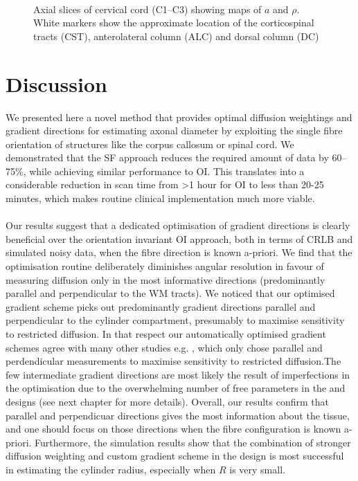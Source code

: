 \begin{figure}[ht]
	\centering
	\\	
	\caption{Axial slices of cervical cord (C1--C3) showing maps of $a$ and $\rho$. White markers show the approximate location of the corticospinal tracts (CST), anterolateral column (ALC) and dorsal column (DC)}
	\label{fig:chapter7 exp1 monkey data}
\end{figure}

\section{Discussion}
We presented here a novel method that provides optimal diffusion weightings and gradient directions for estimating axonal diameter by exploiting the single fibre orientation of structures like the corpus callosum or spinal cord. We demonstrated that the {\gls{SF}} approach reduces the required amount of data by 60--75\%, while achieving similar performance to {\gls{OI}}. This translates into a considerable reduction in scan time from >1 hour for {\gls{OI}} to less than 20-25 minutes, which makes routine clinical implementation much more viable.  

\paragraph{}
Our results suggest that a dedicated optimisation of gradient directions is clearly beneficial over the orientation invariant \gls{OI}{} approach, both in terms of CRLB and simulated noisy data, when the fibre direction is known a-priori. We find that the optimisation routine deliberately diminishes angular resolution in favour of measuring diffusion only in the most informative directions (predominantly parallel and perpendicular to the WM tracts). We noticed that our optimised gradient scheme picks out predominantly gradient directions parallel and perpendicular to the cylinder compartment, presumably to maximise sensitivity to restricted diffusion. In that respect our automatically optimised gradient schemes agree with many other studies e.g. \citep{Stanisz:1997,Avram:2008,Assaf:2008,Panagiotaki:2012}, which only chose parallel and perdendicular measurements to maximise sensitivity to restricted diffusion.The few intermediate gradient directions are most likely the result of imperfections in the optimisation due to the overwhelming number of free parameters in the \FD{} and \DO{} designs (see next chapter for more details). Overall, our results confirm that parallel and perpendicuar directions gives the most information about the tissue, and one should focus on those directions when the fibre configuration is known a-priori. Furthermore, the simulation results show that the combination of stronger diffusion weighting and custom gradient scheme in the \FD{} design is most successful in estimating the cylinder radius, especially when $R$ is very small.



